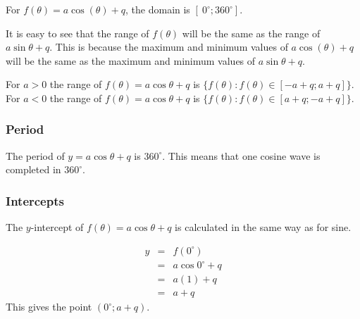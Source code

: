 For $f(\theta )=a\cos(\theta )+q$, the domain is $[~0^{\circ}; 360^{\circ}]$.\par 
It is easy to see that the range of $f(\theta )$ will be the same as the range of $a\sin\theta+q$. This is because the maximum and minimum values of $a\cos(\theta )+q$ will be the same as the maximum and minimum values of $a\sin\theta+q$.\\
\par
For $a>0$ the range of $f(\theta)=a\cos\theta+q$ is $\{f(\theta): f(\theta) \in [-a+q; a+q]\}$. \\
For $a<0$ the range of $f(\theta)=a\cos\theta+q$ is $\{f(\theta): f(\theta) \in [a+q; -a+q]\}$.
\subsubsection*{Period}
The period of $y=a\cos\theta+q$ is $360^{\circ}$. This means that one cosine wave is completed in $360^{\circ}$. 

\subsubsection*{Intercepts}
\nopagebreak
The $y$-intercept of $f(\theta )=a\cos\theta+q$ is calculated in the same way as for sine.\par 
\nopagebreak\noindent{}
\begin{eqnarray*}
  y &=& f({0}^{\circ}) \\
    &=& a\cos 0^{\circ } + q \\
    &=& a(1) + q \\
    &=& a + q
\end{eqnarray*}
This gives the point $(0^{\circ};a+q)$.

